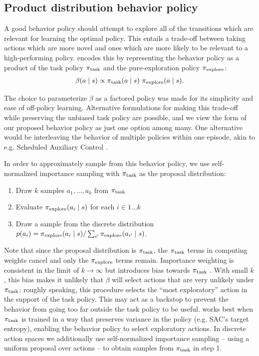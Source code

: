 \subsection{Product distribution behavior policy}
A good behavior policy should attempt to explore all of the transitions which are relevant for learning the optimal policy.
This entails a trade-off between taking actions which are more novel and ones which are more likely to be relevant to a high-performing policy.
\algshort{} encodes this by representing the behavior policy as a product of the task policy $\pi_{\text{task}}$ and the pure-exploration policy $\pi_{\text{explore}}$:
\begin{align} \label{eq:behavior_policy}
\beta(a \mid s) \propto \pi_{\text{task}}(a \mid s) ~ \pi_{\text{explore}}(a \mid s).
\end{align}

The choice to parameterize $\beta$ as a factored policy was made for its simplicity and ease of off-policy learning.
Alternative formulations for making this trade-off while preserving the unbiased task policy are possible, and we view the form of our proposed behavior policy as just one option among many.
One alternative would be interleaving the behavior of multiple policies within one episode, akin to e.g. Scheduled Auxiliary Control \citep{Riedmiller2018LearningBP}.

In order to approximately sample from this behavior policy, we use self-normalized importance sampling with $\pi_{\text{task}}$ as the proposal distribution:
\begin{enumerate}
    \item Draw $k$ samples $a_1, \ldots, a_k$ from $\pi_{\text{task}}$
    \item Evaluate $\pi_{\text{explore}}(a_i \mid s)$ for each $i \in 1 \ldots k$
    \item Draw a sample from the discrete distribution $p(a_i) = \pi_{\text{explore}}(a_i \mid s) / \sum_{i'} \pi_{\text{explore}}(a_{i'} \mid s)$.
\end{enumerate}
Note that since the proposal distribution is $\pi_{\text{task}}$, the $\pi_{\text{task}}$ terms in computing weights cancel and only the $\pi_{\text{explore}}$ terms remain.
Importance weighting is consistent in the limit of $k \to \infty$ but introduces bias towards $\pi_{\text{task}}$ \citep{Vehtari2015ParetoSI}.
With small $k$, this bias makes it unlikely that $\beta$ will select actions that are very unlikely under $\pi_{\text{task}}$; roughly speaking, this procedure selects the ``most exploratory'' action in the support of the task policy.
This may act as a backstop to prevent the behavior from going too far outside the task policy to be useful.
\algshort{} works best when $\pi_{\text{task}}$ is trained in a way that preserves variance in the policy (e.g. SAC's target entropy), enabling the behavior policy to select exploratory actions. In discrete action spaces we additionally use self-normalized importance sampling -- using a uniform proposal over actions -- to obtain samples from $\pi_{\text{task}}$ in step 1.

